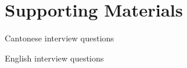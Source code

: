 
\chapter{Supporting Materials}

Cantonese interview questions

English interview questions

\endinput %
